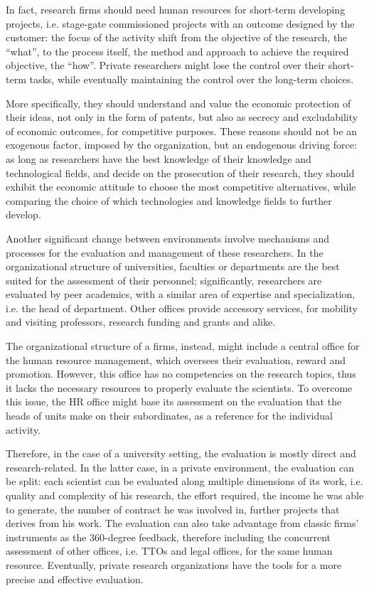 In fact, research firms should need human resources for short-term developing projects, i.e. stage-gate commissioned projects with an outcome designed by the customer: the focus of the activity shift from the objective of the research, the \enquote{what}, to the process itself, the method and approach to achieve the required objective, the \enquote{how}. Private researchers might lose the control over their short-term tasks, while eventually maintaining the control over the long-term choices.

More specifically, they should understand and value the economic protection of their ideas, not only in the form of patents, but also as secrecy and excludability of economic outcomes, for competitive purposes. These reasons should not be an exogenous factor, imposed by the organization, but an endogenous driving force: as long as researchers have the best knowledge of their knowledge and technological fields, and decide on the prosecution of their research, they should exhibit the economic attitude to choose the most competitive alternatives, while comparing the choice of which technologies and knowledge fields to further develop.

Another significant change between environments involve mechanisms and processes for the evaluation and management of these researchers. In the organizational structure of universities, faculties or departments are the best suited for the assessment of their personnel; significantly, researchers are evaluated by peer academics, with a similar area of expertise and specialization, i.e. the head of department. Other offices provide accessory services, for mobility and visiting professors, research funding and grants and alike.

The organizational structure of a firms, instead, might include a central office for the human resource management, which oversees their evaluation, reward and promotion. However, this office has no competencies on the research topics, thus it lacks the necessary resources to properly evaluate the scientists. To overcome this issue, the HR office might base its assessment on the evaluation that the heads of units make on their subordinates, as a reference for the individual activity.

Therefore, in the case of a university setting, the evaluation is mostly direct and research-related. In the latter case, in a private environment, the evaluation can be split: each scientist can be evaluated along multiple dimensions of its work, i.e. quality and complexity of his research, the effort required, the income he was able to generate, the number of contract he was involved in, further projects that derives from his work. The evaluation can also take advantage from classic firms' instruments as the 360-degree feedback, therefore including the concurrent assessment of other offices, i.e. TTOs and legal offices, for the same human resource. Eventually, private research organizations have the tools for a more precise and effective evaluation.

